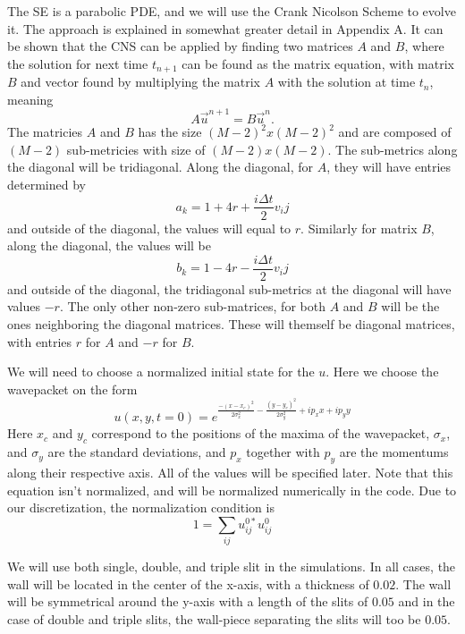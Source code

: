 \documentclass[english,notitlepage,reprint,nofootinbib]{revtex4-1}  %
\begin{document}
The SE is a parabolic PDE, and we will use the Crank Nicolson Scheme to evolve it. The approach is explained in somewhat greater detail in Appendix A. It can be shown that the CNS can be applied by finding two matrices $A$ and $B$, where the solution for next time $t_{n+1}$ can be found as the matrix equation, with matrix $B$ and vector found by multiplying the matrix $A$ with the solution at time $t_n$, meaning
\begin{equation}
    A \vec{u}^{n+1} = B \vec{u}^n.
\end{equation}
The matricies $A$ and $B$ has the size $(M-2)^2x(M-2)^2$ and are composed of $(M-2)$ sub-metricies with size of $(M-2)x(M-2)$. The sub-metrics along the diagonal will be tridiagonal. Along the diagonal, for  $A$, they will have entries determined by
\begin{equation}
    a_k = 1 + 4r + \frac{i \Delta t}{2} v_ij
\end{equation}
and outside of the diagonal, the values will equal to $r$. Similarly for matrix $B$, along the diagonal, the values will be
\begin{equation}
    b_k = 1 - 4r - \frac{i \Delta t}{2} v_ij
\end{equation}
and outside of the diagonal, the tridiagonal sub-metrics at the diagonal will have values $-r$. The only other non-zero sub-matrices, for both $A$ and $B$ will be the ones neighboring the diagonal matrices. These will themself be diagonal matrices, with entries $r$ for $A$ and $-r$ for $B$.


We will need to choose a normalized initial state for the $u$. Here we choose the wavepacket on the form
\begin{equation}
    u(x,y,t=0) = e^{\frac{-(x-x_c)^2}{2 \sigma_x^2} - \frac{(y-y_c)^2}{2 \sigma_y^2} + ip_xx + ip_yy}
\end{equation}
Here $x_c$ and $y_c$ correspond to the positions of the maxima of the wavepacket, $\sigma_x$, and $\sigma_y$ are the standard deviations, and $p_x$ together with $p_y$ are the momentums along their respective axis. All of the values will be specified later. Note that this equation isn't normalized, and will be normalized numerically in the code. Due to our discretization, the normalization condition is
\begin{equation}
    1 = \sum_{ij} u^{0*}_{ij} u^0_{ij}
\end{equation}

We will use both single, double, and triple slit in the simulations. In all cases, the wall will be located in the center of the x-axis, with a thickness of $0.02$. The wall will be symmetrical around the y-axis with a length of the slits of $0.05$ and in the case of double and triple slits, the wall-piece separating the slits will too be $0.05$. 
\end{document}
